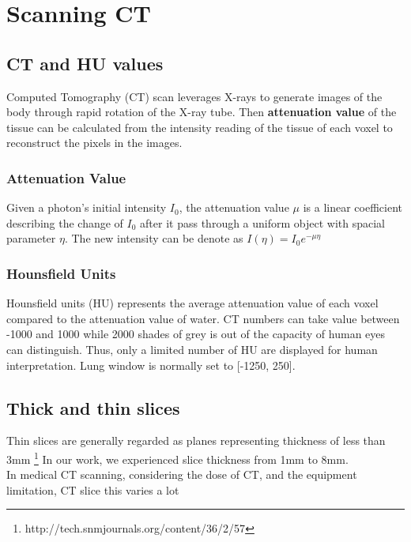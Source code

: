 \section{Scanning CT}

\subsection{CT and HU values}
Computed Tomography (CT) scan leverages X-rays to generate images of the body through rapid rotation of the X-ray tube. Then \textbf{attenuation value} of the tissue can be calculated from the intensity reading of the tissue of each voxel to reconstruct the pixels in the images.\\

\subsubsection{Attenuation Value}
Given a photon's initial intensity $I_{0}$, the attenuation value $\mu$ is a linear coefficient describing the change of $I_{0}$ after it pass through a uniform object with spacial parameter $\eta$. The new intensity can be denote as $I(\eta)=I_{0} e^{-\mu \eta}$

\subsubsection{Hounsfield Units}
Hounsfield units (HU) represents the average attenuation value of each voxel compared to the attenuation value of water. CT numbers can take value between -1000 and 1000 while 2000 shades of grey is out of the capacity of human eyes can distinguish. Thus, only a limited number of HU are displayed for human interpretation. Lung window is normally set to [-1250, 250].

\subsection{Thick and thin slices}
Thin slices are generally regarded as planes representing thickness of less than 3mm \footnote{http://tech.snmjournals.org/content/36/2/57} In our work, we experienced slice thickness from 1mm to 8mm. \\
{\color{red} In medical CT scanning, considering the dose of CT, and the equipment limitation, CT slice this varies a lot}

\newpage

